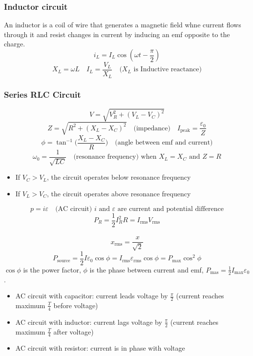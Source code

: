 \documentclass[8pt,twocolumn]{extarticle}
\begin{document}
\subsubsection*{Inductor circuit}
An inductor is a coil of wire that generates a magnetic field whne current flows through it and
resist changes in current by inducing an emf opposite to the charge.
\[i_L = I_L\cos(\omega t - \frac{\pi}{2})\]
\[X_L=\omega L\quad I_L=\frac{V_L}{X_L}\quad\text{($X_L$ is Inductive reactance)}\]
\subsubsection*{Series RLC Circuit}
\[V=\sqrt{V_R^2 + {(V_L - V_C)}^2}\]
\[Z=\sqrt{R^2 + {(X_L - X_C)}^2}\quad\text{(impedance)}\quad I_\text{peak}=\frac{\varepsilon_0}{Z}
\]
\[\phi = \tan^{-1}\Big(\frac{X_L - X_C}{R}\Big)\quad\text{(angle between emf and current)}\]
\[\omega_0 = \frac{1}{\sqrt{LC}}\quad\text{(resonance frequency) when $X_L=X_C$ and $Z=R$}\]
\begin{itemize}
    \item If $V_C > V_L$, the circuit operates below resonance frequency
    \item If $V_L > V_C$, the circuit operates above resonance frequency
\end{itemize}
\[p=i\varepsilon\quad\text{(AC circuit) $i$ and $\varepsilon$ are current and potential difference}
\]
\[P_R = \frac{1}{2}I_R^2 R=I_\text{rms}V_\text{rms}\]\
\[x_\text{rms}=\frac{x}{\sqrt{2}}\]
\[P_\text{source}=\frac{1}{2}I\varepsilon_0\cos\phi = I_\text{rms}\varepsilon_\text{rms}\cos\phi=
P_\text{max}\cos^2\phi\]
$\cos\phi$ is the power factor, $\phi$ is the phase between current and emf, $P_\text{mas}=
\frac{1}{2}I_\text{max}\varepsilon_0$.
\begin{itemize}
    \item AC circuit with capacitor: current leads voltage by $\frac{\pi}{2}$ (current reaches
    maximum $\frac{T}{4}$ before voltage)
    \item AC circuit with inductor: current lags voltage by $\frac{\pi}{2}$ (current reaches
    maximum $\frac{T}{4}$ after voltage)
    \item AC circuit with resistor: current is in phase with voltage
\end{itemize}
\end{document}
